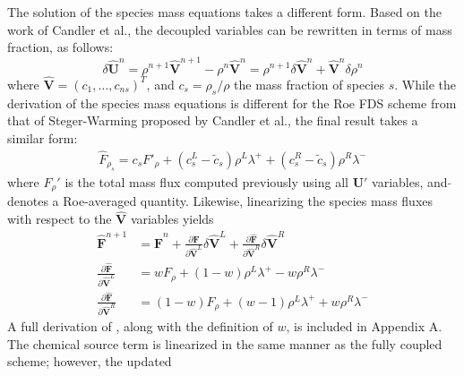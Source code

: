 The solution of the species mass equations takes a different form.  Based on the
work of Candler et al.\cite{candler}, the decoupled variables can be rewritten
in terms of mass fraction, as follows:
\begin{equation}
  \delta \mathbf{\hat{U}}^n =
  \rho^{n+1}\mathbf{\hat{V}}^{n+1}-\rho^n\mathbf{\hat{V}}^n = \rho^{n+1} \delta
  \mathbf{\hat{V}}^n + \mathbf{\hat{V}}^n \delta \rho^n 
\end{equation}
where $\mathbf{\hat{V}}=(c_1,\hdots,c_{ns})^T$, and $c_s=\rho_s/\rho$ the mass
fraction of species $s$.  While the derivation of the species mass equations is
different for the Roe FDS scheme from that of Steger-Warming proposed by Candler
et al.\cite{candler}, the final result takes a similar form: 
\begin{gather}
  \hat{F}_{\rho_s} = c_s F'_\rho+(c_s^L-\tilde{c}_s)\rho^L\lambda^+
  + (c_s^R-\tilde{c}_s)\rho^R\lambda^-
  \label{dc_flux}
\end{gather}
where $F_\rho'$ is the total mass flux computed previously using all
$\mathbf{U}'$ variables, and $\tilde{}$ denotes a Roe-averaged quantity.
Likewise, linearizing the species mass fluxes with respect to the
$\mathbf{\hat{V}}$ variables yields
\begin{align} 
  \mathbf{\hat{F}}^{n+1} &= \mathbf{\hat{F}}^n +\frac{\partial
  \mathbf{\hat{F}}}{\partial \mathbf{\hat{V}}^L}\delta \mathbf{\hat{V}}^L
  +\frac{\partial \mathbf{\hat{F}}}{\partial \mathbf{\hat{V}}^R}\delta
  \mathbf{\hat{V}}^R \\ \frac{\partial \mathbf{\hat{F}}}{\partial
  \mathbf{\hat{V}}^L} &= wF_\rho+(1-w)\rho^L\lambda^+ - w\rho^R\lambda^- \\
  \frac{\partial \mathbf{\hat{F}}}{\partial \mathbf{\hat{V}}^R} &=
  (1-w)F_\rho+(w-1)\rho^L\lambda^+ + w\rho^R\lambda^-
  \label{d_last}
\end{align}
A full derivation of , along with the
definition of $w$, is included in Appendix A.  The chemical source term is
linearized in the same manner as the fully coupled scheme; however, the updated
